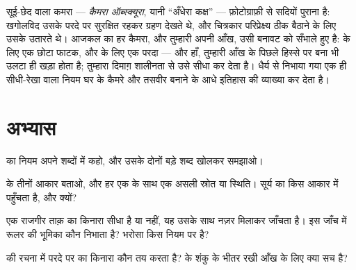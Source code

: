 \begin{remark}[एक पुराना और आदरणीय डिब्बा]\label{rem:g6:light-propagation:history}
सूई-छेद वाला कमरा --- \emph{कैमरा ऑब्स्क्यूरा}, यानी ``अँधेरा कक्ष''
--- फ़ोटोग्राफ़ी से सदियों पुराना है: खगोलविद उसके परदे पर सुरक्षित रहकर
ग्रहण देखते थे, और चित्रकार परिप्रेक्ष्य ठीक बैठाने के लिए उसके
 उतारते थे। आजकल का हर कैमरा, और तुम्हारी अपनी आँख, उसी
बनावट को सँभाले हुए है:  के लिए एक छोटा फाटक, और  के
लिए एक परदा --- और हाँ, तुम्हारी आँख के पिछले हिस्से पर बना 
भी उलटा ही खड़ा होता है; तुम्हारा दिमाग़ शालीनता से उसे सीधा कर देता
है। धैर्य से निभाया गया एक ही सीधी-रेखा वाला नियम घर के कैमरे और
तसवीर बनाने के आधे इतिहास की व्याख्या कर देता है।
\end{remark}

\section{अभ्यास}

\begin{exercise}[$\star$]\label{exo:g6:light-propagation:1}
 का नियम अपने शब्दों में कहो, और उसके दोनों बड़े शब्द
खोलकर समझाओ।
\end{exercise}

\begin{exercise}[$\star$]\label{exo:g6:light-propagation:2}
 के तीनों आकार बताओ, और हर एक के साथ एक असली स्रोत या स्थिति।
सूर्य का  किस आकार में पहुँचता है, और क्यों?
\end{exercise}

\begin{exercise}[$\star$]\label{exo:g6:light-propagation:3}
एक राजगीर ताक़ का किनारा सीधा है या नहीं, यह उसके साथ नज़र मिलाकर
जाँचता है। इस जाँच में रूलर की भूमिका कौन निभाता है? भरोसा किस नियम पर
है?
\end{exercise}

\begin{exercise}[$\star$]\label{exo:g6:light-propagation:4}
 की रचना में परदे पर  का किनारा कौन तय करता है?  के शंकु
के भीतर रखी आँख के लिए क्या सच है?
\end{exercise}

